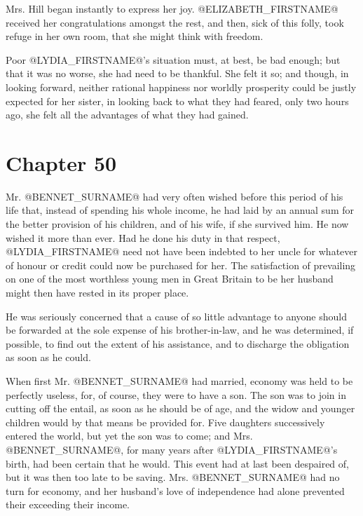 Mrs. Hill began instantly to express her joy. @ELIZABETH_FIRSTNAME@ received her
congratulations amongst the rest, and then, sick of this folly, took
refuge in her own room, that she might think with freedom.

Poor @LYDIA_FIRSTNAME@'s situation must, at best, be bad enough; but that it was
no worse, she had need to be thankful. She felt it so; and though, in
looking forward, neither rational happiness nor worldly prosperity could
be justly expected for her sister, in looking back to what they had
feared, only two hours ago, she felt all the advantages of what they had
gained.



\chapter*{Chapter 50}


Mr. @BENNET_SURNAME@ had very often wished before this period of his life that,
instead of spending his whole income, he had laid by an annual sum for
the better provision of his children, and of his wife, if she survived
him. He now wished it more than ever. Had he done his duty in that
respect, @LYDIA_FIRSTNAME@ need not have been indebted to her uncle for whatever
of honour or credit could now be purchased for her. The satisfaction of
prevailing on one of the most worthless young men in Great Britain to be
her husband might then have rested in its proper place.

He was seriously concerned that a cause of so little advantage to anyone
should be forwarded at the sole expense of his brother-in-law, and he
was determined, if possible, to find out the extent of his assistance,
and to discharge the obligation as soon as he could.

When first Mr. @BENNET_SURNAME@ had married, economy was held to be perfectly
useless, for, of course, they were to have a son. The son was to join
in cutting off the entail, as soon as he should be of age, and the widow
and younger children would by that means be provided for. Five daughters
successively entered the world, but yet the son was to come; and Mrs.
@BENNET_SURNAME@, for many years after @LYDIA_FIRSTNAME@'s birth, had been certain that he
would. This event had at last been despaired of, but it was then
too late to be saving. Mrs. @BENNET_SURNAME@ had no turn for economy, and her
husband's love of independence had alone prevented their exceeding their
income.

